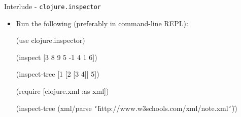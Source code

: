 \documentclass{beamer}
\renewcommand{\textquotedbl}{\texttt{\char`\"}}
\begin{document}
\begin{frame}{Interlude - \texttt{clojure.inspector}}
  \begin{itemize}
  \item Run the following (preferably in command-line REPL):\\

\bigskip

{\ttfamily\color{black}
%
\textcolor[rgb]{0.54901963,0.54901963,0.54901963}{(}\textcolor[rgb]{0.28235295,0.23921569,0.54509807}{use}
{\textquotesingle}clojure.inspector\textcolor[rgb]{0.54901963,0.54901963,0.54901963}{)}}


\bigskip

{\ttfamily\color{black}
\textcolor[rgb]{0.54901963,0.54901963,0.54901963}{(}\textcolor[rgb]{0.13333334,0.54509807,0.13333334}{inspect}
[3 8 9 5 -1 4 1 6]\textcolor[rgb]{0.54901963,0.54901963,0.54901963}{)}}


\bigskip

{\ttfamily\color{black}
\textcolor[rgb]{0.54901963,0.54901963,0.54901963}{(}\textcolor[rgb]{0.13333334,0.54509807,0.13333334}{inspect-tree}
[1 [2 [3 4]] 5]\textcolor[rgb]{0.54901963,0.54901963,0.54901963}{)}}


\bigskip

{\ttfamily\color{black}
\textcolor[rgb]{0.54901963,0.54901963,0.54901963}{(}\textcolor[rgb]{0.28235295,0.23921569,0.54509807}{require}
{\textquotesingle}[clojure.xml
\textcolor[rgb]{0.0,0.54509807,0.54509807}{:as}
xml]\textcolor[rgb]{0.54901963,0.54901963,0.54901963}{)}}

{\ttfamily\color{black}
\textcolor[rgb]{0.54901963,0.54901963,0.54901963}{(}\textcolor[rgb]{0.13333334,0.54509807,0.13333334}{inspect-tree}
\textcolor[rgb]{0.54901963,0.54901963,0.54901963}{(}xml/parse
\textcolor[rgb]{0.54509807,0.13333334,0.32156864}{{\textquotedbl}http://www.w3schools.com/xml/note.xml{\textquotedbl}}\textcolor[rgb]{0.54901963,0.54901963,0.54901963}{))}}
  \end{itemize}
\end{frame}
\end{document}
